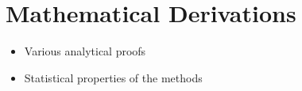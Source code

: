 \chapter{Mathematical Derivations}
\label{app:mathematical-derivations}
\begin{itemize}
\item Various analytical proofs
\item Statistical properties of the methods
\end{itemize}